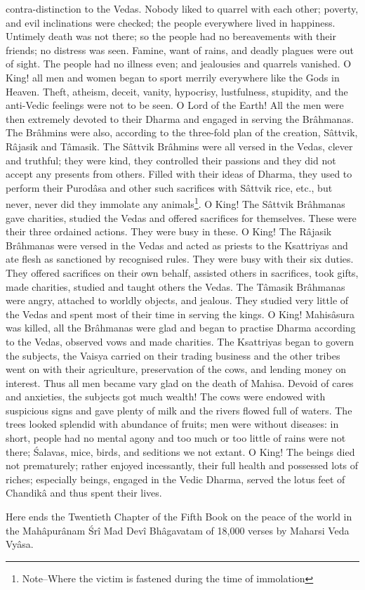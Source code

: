 contra-distinction to the Vedas. Nobody liked to quarrel with each other; poverty, and evil inclinations were checked; the people everywhere lived in happiness. Untimely death was not there; so the people had no bereavements with their friends; no distress was seen. Famine, want of rains, and deadly plagues were out of sight. The people had no illness even; and jealousies and quarrels vanished. O King! all men and women began to sport merrily everywhere like the Gods in Heaven. Theft, atheism, deceit, vanity, hypocrisy, lustfulness, stupidity, and the anti-Vedic feelings were not to be seen. O Lord of the Earth! All the men were then extremely devoted to their Dharma and engaged in serving the Br\^ahmanas. The Br\^ahmins were also, according to the three-fold plan of the creation, S\^attvik, R\^ajasik and T\^amasik. The S\^attvik Br\^ahmins were all versed in the Vedas, clever and truthful; they were kind, they controlled their passions and they did not accept any presents from others. Filled with their ideas of Dharma, they used to perform their Purod\^asa and other such sacrifices with S\^attvik rice, etc., but never, never did they immolate any animals\footnote{Note--Where the victim is fastened during the time of immolation}. O King! The S\^attvik Br\^ahmanas gave charities, studied the Vedas and offered sacrifices for themselves. These were their three ordained actions. They were busy in these. O King! The R\^ajasik Br\^ahmanas were versed in the Vedas and acted as priests to the Ksattriyas and ate flesh as sanctioned by recognised rules. They were busy with their six duties. They offered sacrifices on their own behalf, assisted others in sacrifices, took gifts, made charities, studied and taught others the Vedas. The T\^amasik Br\^ahmanas were angry, attached to worldly objects, and jealous. They studied very little of the Vedas and spent most of their time in serving the kings. O King! Mahis\^asura was killed, all the Br\^ahmanas were glad and began to practise Dharma according to the Vedas, observed vows and made charities. The Ksattriyas began to govern the subjects, the Vaisya carried on their trading business and the other tribes went on with their agriculture, preservation of the cows, and lending money on interest. Thus all men became vary glad on the death of Mahisa. Devoid of cares and anxieties, the subjects got much wealth! The cows were endowed with suspicious signs and gave plenty of milk and the rivers flowed full of waters. The trees looked splendid with abundance of fruits; men were without diseases: in short, people had no mental agony and too much or too little of rains were not there; \'Salavas, mice, birds, and seditions we not extant. O King! The beings died not prematurely; rather enjoyed incessantly, their full health and possessed lots of riches; especially beings, engaged in the Vedic Dharma, served the lotus feet of Chandik\^a and thus spent their lives.

Here ends the Twentieth Chapter of the Fifth Book on the peace of the world in the Mah\^apur\^anam \'Sr\^i Mad Dev\^i Bh\^agavatam of 18,000 verses by Maharsi Veda Vy\^asa.

